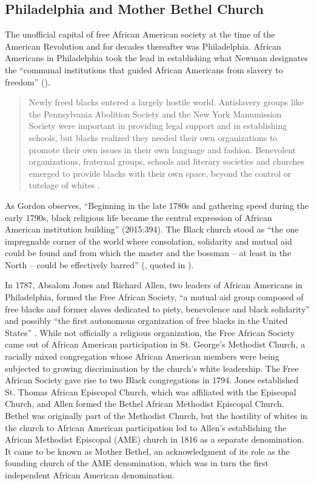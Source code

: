 \documentclass[output=paper,colorlinks,citecolor=brown]{langscibook}
\begin{document}
\subsection{Philadelphia and Mother Bethel Church}
\begin{sloppypar}
The unofficial capital of free African American society at the time of the American Revolution and for decades thereafter was Philadelphia. African Americans in Philadelphia took the lead in establishing what Newman designates the “communal institutions that guided African Americans from slavery to freedom” (\citeyear[5]{prophetNewman2008}). 
\end{sloppypar}

\begin{quote}
Newly freed blacks entered a largely hostile world. Antislavery groups like the Pennsylvania Abolition Society and the New York Manumission Society were important in providing legal support and in establishing schools, but blacks realized they needed their own organizations to promote their own issues in their own language and fashion. Benevolent organizations, fraternal groups, schools and literary societies and churches emerged to provide blacks with their own space, beyond the control or tutelage of whites \citep{librarycompany2011}.%
\end{quote}

As Gordon observes, “Beginning in the late 1780s and gathering speed during the early 1790s, black religious life became the central expression of African American institution building” (2015:394). The Black church stood as “the one impregnable corner of the world where consolation, solidarity and mutual aid could be found and from which the master and the bossman -- at least in the North -- could be effectively barred” (\citealt[106]{Wilmore1972}, quoted in \citealt[114]{Nash1988}).

In 1787, Absalom Jones and Richard Allen, two leaders of African Americans in Philadelphia, formed the Free African Society, “a mutual aid group composed of free blacks and former slaves dedicated to piety, benevolence and black solidarity” \citep[9]{Newman2008} and possibly “the first autonomous organization of free blacks in the United States” \citep[332]{Nash1989}. While not officially a religious organization, the Free African Society came out of African American participation in St. George’s Methodist Church, a racially mixed congregation whose African American members were being subjected to growing discrimination by the church’s white leadership. The Free African Society gave rise to two Black congregations in 1794. Jones established St. Thomas African Episcopal Church, which was affiliated with the Episcopal Church, and Allen formed the Bethel African Methodist Episcopal Church. Bethel was originally part of the Methodist Church, but the hostility of whites in the church to African American participation led to Allen’s establishing the African Methodist Episcopal (AME) church in 1816 as a separate denomination. It came to be known as Mother Bethel, an acknowledgment of its role as the founding church of the AME denomination, which was in turn the first independent African American denomination.
\end{document}
